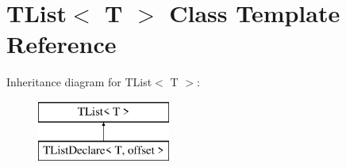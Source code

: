 \hypertarget{class_t_list}{\section{T\-List$<$ T $>$ Class Template Reference}
\label{class_t_list}
}
Inheritance diagram for T\-List$<$ T $>$\-:\begin{figure}[H]
\begin{center}
\leavevmode
\includegraphics[height=2.000000cm]{class_t_list}
\end{center}
\end{figure}
